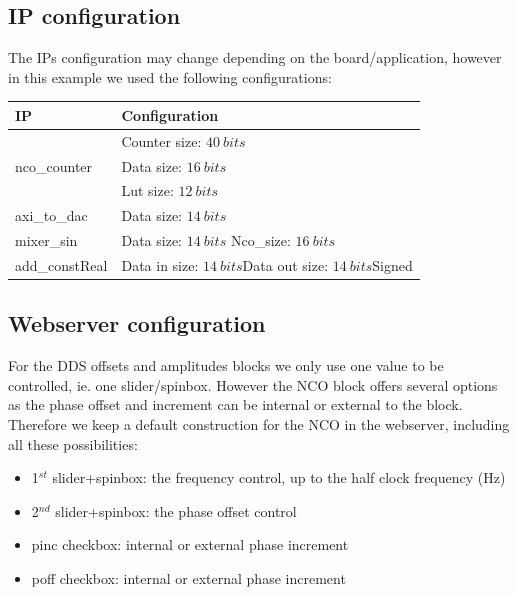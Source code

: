 \documentclass[12pt,oneside]{article}
\begin{document}
\subsection{IP configuration}
\vspace{0.5cm}
The IPs configuration may change depending on the board/application, however in this example we used the following configurations:
\begin{center}
	\begin{tabular}{|>{\centering\arraybackslash}m{.3\linewidth} | >{\centering\arraybackslash}m{.3\linewidth} |}
\hline
IP & Configuration \\
\hline
 & Counter size: $40~bits$\\ nco\_counter &Data size: $16~bits$\\ &Lut size: $12~bits$ \\
\hline
axi\_to\_dac&Data size: $14~bits$ \\
\hline
mixer\_sin&Data size: $14~bits$ \newline Nco\_size: $16~bits$ \\
\hline
add\_constReal&Data in size: $14~bits$\newline Data out size: $14~bits$\newline Signed \\
\hline
\end{tabular}
\end{center}
\vspace{0.1cm}
\subsection{Webserver configuration}\label{subsec:doubleDDSws}

For the DDS offsets and amplitudes blocks we only use one value to be controlled, ie. one slider/spinbox. However the NCO block offers several options as the phase offset and increment can be internal or external to the block. Therefore we keep a default construction for the NCO in the webserver, including all these possibilities: 
\begin{itemize}
	\setlength\itemsep{-0.1cm}
	\item 1$^{st}$ slider+spinbox: the frequency control, up to the half clock frequency (Hz)
	\item 2$^{nd}$ slider+spinbox: the phase offset control
	\item pinc checkbox: internal or external phase increment
	\item poff checkbox: internal or external phase increment
\end{itemize} 
\end{document}

